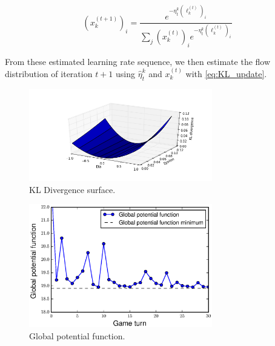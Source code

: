 \documentclass{sig-alternate-ipsn13}
\begin{document}
\begin{equation} \label{eq:KL_update}
  (x_k^{(t+1)})_i = \frac{e^{-\eta_t^k (\ell^{(t)}_k)_i}}{\sum_j (x_k^{(t)})_i e^{-\eta_t^k (\ell^{(t)}_k)_i}}
\end{equation}

From these estimated learning rate sequence, we then estimate the flow distribution of iteration $t+1$ using $\hat \eta^k_t $ and $x_k^{(t)}$ with \ref{eq:KL_update}.

\begin{figure}
  \centering
  \includegraphics[width=80mm]{images/no_slider_KL_divergence_surface}
  \caption{KL Divergence surface.}
  \label{fig:kl_divergence_surface}
\end{figure}


\begin{figure}
  \centering
  \includegraphics[width=80mm]{images/no_slider_global_potential_function}
  \caption{Global potential function.}
  \label{fig:global_potential_function}
\end{figure}




\end{document}
